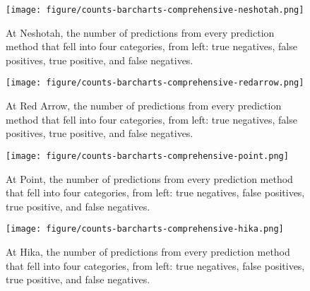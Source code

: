 \documentclass[authoryear,review, 12pt]{elsarticle}
\begin{document}
\begin{figure}[htbp]
\centering
\texttt{[image: figure/counts-barcharts-comprehensive-neshotah.png]}
\caption{At Neshotah, the number of predictions from every prediction
method that fell into four categories, from left: true negatives, false
positives, true positive, and false negatives.}
\end{figure}

\begin{figure}[htbp]
\centering
\texttt{[image: figure/counts-barcharts-comprehensive-redarrow.png]}
\caption{At Red Arrow, the number of predictions from every prediction
method that fell into four categories, from left: true negatives, false
positives, true positive, and false negatives.}
\end{figure}

\begin{figure}[htbp]
\centering
\texttt{[image: figure/counts-barcharts-comprehensive-point.png]}
\caption{At Point, the number of predictions from every prediction
method that fell into four categories, from left: true negatives, false
positives, true positive, and false negatives.}
\end{figure}

\begin{figure}[htbp]
\centering
\texttt{[image: figure/counts-barcharts-comprehensive-hika.png]}
\caption{At Hika, the number of predictions from every prediction method
that fell into four categories, from left: true negatives, false
positives, true positive, and false negatives.}
\end{figure}

 


 
 
\end{document}
